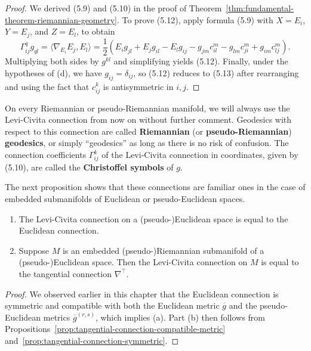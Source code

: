 \begin{corollary}
\begin{proof}
We derived (5.9) and (5.10) in the proof of Theorem~\ref{thm:fundamental-theorem-riemannian-geometry}. To prove (5.12), apply formula (5.9) with $X = E_i$, $Y = E_j$, and $Z = E_l$, to obtain
\[
\Gamma^q_{ij}g_{ql} = \langle \nabla_{E_i} E_j, E_l \rangle
= \frac{1}{2}\left(E_i g_{jl} + E_j g_{il} - E_l g_{ij} - g_{jm}c^m_{il} - g_{lm}c^m_{ji} + g_{im}c^m_{lj}\right).
\]
Multiplying both sides by $g^{kl}$ and simplifying yields (5.12). Finally, under the hypotheses of (d), we have $g_{ij} = \delta_{ij}$, so (5.12) reduces to (5.13) after rearranging and using the fact that $c^k_{ij}$ is antisymmetric in $i, j$.
\end{proof}
\end{corollary}

On every Riemannian or pseudo-Riemannian manifold, we will always use the Levi-Civita connection from now on without further comment. Geodesics with respect to this connection are called \textbf{Riemannian} (or \textbf{pseudo-Riemannian}) \textbf{geodesics}, or simply ``geodesics'' as long as there is no risk of confusion. The connection coefficients $\Gamma^k_{ij}$ of the Levi-Civita connection in coordinates, given by (5.10), are called the \textbf{Christoffel symbols} of $g$.

The next proposition shows that these connections are familiar ones in the case of embedded submanifolds of Euclidean or pseudo-Euclidean spaces.

\begin{proposition}
\label{prop:levi-civita-on-euclidean-and-submanifolds}

\begin{enumerate}
\item[(a)] The Levi-Civita connection on a (pseudo-)Euclidean space is equal to the Euclidean connection.
\item[(b)] Suppose $M$ is an embedded (pseudo-)Riemannian submanifold of a (pseudo-)Euclidean space. Then the Levi-Civita connection on $M$ is equal to the tangential connection $\nabla^\top$.
\end{enumerate}

\begin{proof}
We observed earlier in this chapter that the Euclidean connection is symmetric and compatible with both the Euclidean metric $\overline{g}$ and the pseudo-Euclidean metrics $\overline{g}^{(r,s)}$, which implies (a). Part (b) then follows from Propositions~\ref{prop:tangential-connection-compatible-metric} and~\ref{prop:tangential-connection-symmetric}.
\end{proof}
\end{proposition}

